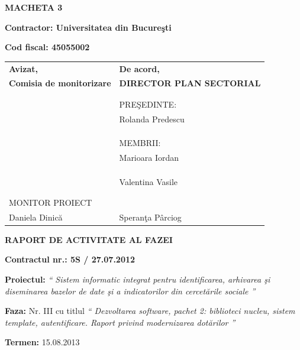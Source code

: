 \documentclass[a4paper, 10pt]{article}
\title{}
\author{}
\date{2013-04-08}
\begin{document}
{\raggedleft\bfseries
MACHETA 3
\par}

\textbf{Contractor: Universitatea din Bucure\c{s}ti}

\textbf{Cod fiscal: 45055002}

\bigskip

\begin{tabular}{@{}l l}
\textbf{Avizat,}&\textbf{De acord,}\\
\textbf{Comisia de monitorizare} &\textbf{DIRECTOR PLAN SECTORIAL}\\
\\
\\
  & PRE\c{S}EDINTE:\\
  & Rolanda Predescu\\
\\
\\
\\
&MEMBRII:\\
&Marioara Iordan\\
\\
\\
\\
&Valentina Vasile\\
\\
\\
MONITOR PROIECT & \\
Daniela Dinic\u{a}&Speran\c{t}a P\^{a}rciog\\
\end{tabular}

\bigskip

\bigskip

\bigskip

\bigskip

\bigskip

{\centering\bfseries
RAPORT DE ACTIVITATE AL FAZEI
\par}

\bigskip

{\bfseries
Contractul nr.: 5S / 27.07.2012}

{
\textbf{Proiectul: }
\textit{`` Sistem informatic integrat pentru identificarea, arhivarea \c{s}i diseminarea bazelor de date \c{s}i a indicatorilor din
cercet\u{a}rile sociale ''}}

{
\textbf{Faza: }
Nr. III cu titlul
\textit{`` Dezvoltarea software, pachet 2: biblioteci nucleu, sistem template, autentificare. Raport privind modernizarea dot\u{a}rilor ''}}

{\textbf{Termen:} 15.08.2013}
\end{document}
